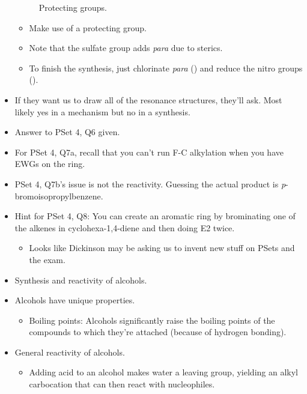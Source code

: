 \documentclass[../notes.tex]{subfiles}
\begin{document}
\begin{itemize}
\begin{figure}[h!]
        \schemestop
        \caption{Protecting groups.}
        \label{fig:protectingGroup}
    \end{figure}
    \begin{itemize}
        \item Make use of a protecting group.\par
        \item Note that the sulfate group adds \emph{para} due to sterics.
        \item To finish the synthesis, just chlorinate \emph{para} () and reduce the nitro groups ().
    \end{itemize}
    \item If they want us to draw all of the resonance structures, they'll ask. Most likely yes in a mechanism but no in a synthesis.
    \item Answer to PSet 4, Q6 given.
    \item For PSet 4, Q7a, recall that you can't run F-C alkylation when you have EWGs on the ring.
    \item PSet 4, Q7b's issue is not the reactivity. Guessing the actual product is \emph{p}-bromoisopropylbenzene.
    \item Hint for PSet 4, Q8: You can create an aromatic ring by brominating one of the alkenes in cyclohexa-1,4-diene and then doing E2 twice.
    \begin{itemize}
        \item Looks like Dickinson may be asking us to invent new stuff on PSets and the exam.
    \end{itemize}
    \item Synthesis and reactivity of alcohols.
    \item Alcohols have unique properties.
    \begin{itemize}
        \item Boiling points: Alcohols significantly raise the boiling points of the compounds to which they're attached (because of hydrogen bonding).
    \end{itemize}
    \item General reactivity of alcohols.
    \begin{itemize}
        \item Adding acid to an alcohol makes water a leaving group, yielding an alkyl carbocation that can then react with nucleophiles.

\end{itemize}
\end{itemize}
\end{document}
